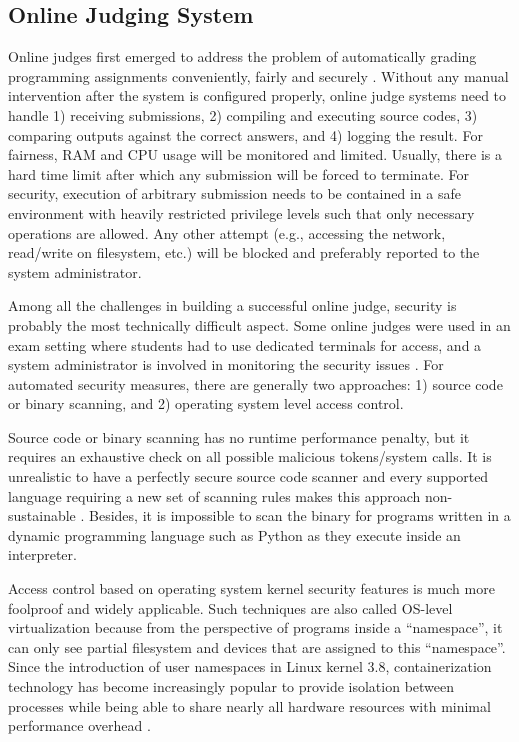 \subsection{Online Judging System}
Online judges first emerged to address the problem of automatically grading programming assignments conveniently, fairly and securely \parencite{RN4}. Without any manual intervention after the system is configured properly, online judge systems need to handle 1) receiving submissions, 2) compiling and executing source codes, 3) comparing outputs against the correct answers, and 4) logging the result. For fairness, RAM and CPU usage will be monitored and limited. Usually, there is a hard time limit after which any submission will be forced to terminate. For security, execution of arbitrary submission needs to be contained in a safe environment with heavily restricted privilege levels such that only necessary operations are allowed. Any other attempt (e.g., accessing the network, read/write on filesystem, etc.) will be blocked and preferably reported to the system administrator. 

Among all the challenges in building a successful online judge, security is probably the most technically difficult aspect. Some online judges were used in an exam setting where students had to use dedicated terminals for access, and a system administrator is involved in monitoring the security issues \parencite{10.1145/384267.305835}. For automated security measures, there are generally two approaches: 1) source code or binary scanning, and 2) operating system level access control. 

Source code or binary scanning has no runtime performance penalty, but it requires an exhaustive check on all possible malicious tokens/system calls. It is unrealistic to have a perfectly secure source code scanner and every supported language requiring a new set of scanning rules makes this approach non-sustainable \parencite{RN4}. Besides, it is impossible to scan the binary for programs written in a dynamic programming language such as Python as they execute inside an interpreter.

Access control based on operating system kernel security features is much more foolproof and widely applicable. Such techniques are also called OS-level virtualization because from the perspective of programs inside a ``namespace'', it can only see partial filesystem and devices that are assigned to this “namespace”. Since the introduction of user namespaces in Linux kernel 3.8, containerization technology has become increasingly popular to provide isolation between processes while being able to share nearly all hardware resources with minimal performance overhead \parencite{RN16}. 

